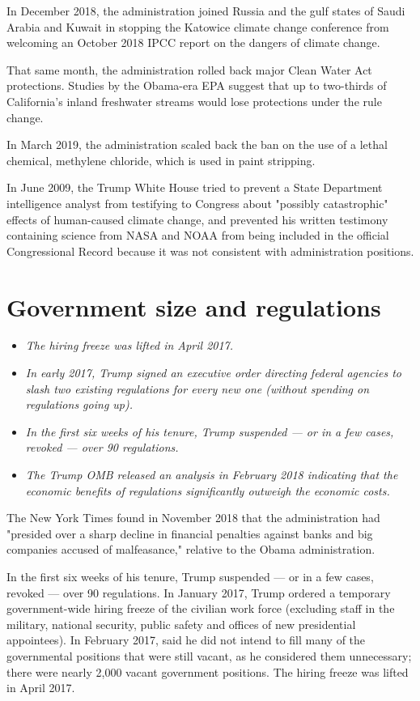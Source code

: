 In December 2018, the administration joined Russia and the gulf states
of Saudi Arabia and Kuwait in stopping the Katowice climate change
conference from welcoming an October 2018 IPCC report on the dangers of
climate change.

That same month, the administration rolled back major Clean Water Act
protections. Studies by the Obama-era EPA suggest that up to two-thirds
of California's inland freshwater streams would lose protections under
the rule change.

In March 2019, the administration scaled back the ban on the use of a
lethal chemical, methylene chloride, which is used in paint stripping.

In June 2009, the Trump White House tried to prevent a State Department
intelligence analyst from testifying to Congress about "possibly
catastrophic" effects of human-caused climate change, and prevented his
written testimony containing science from NASA and NOAA from being
included in the official Congressional Record because it was not
consistent with administration positions.

\section{Government size and
regulations}\label{government-size-and-regulations}

\begin{itemize}
\item
  \emph{The hiring freeze was lifted in April 2017.}
\item
  \emph{In early 2017, Trump signed an executive order directing federal
  agencies to slash two existing regulations for every new one (without
  spending on regulations going up).}
\item
  \emph{In the first six weeks of his tenure, Trump suspended --- or in
  a few cases, revoked --- over 90 regulations.}
\item
  \emph{The Trump OMB released an analysis in February 2018 indicating
  that the economic benefits of regulations significantly outweigh the
  economic costs.}
\end{itemize}

The New York Times found in November 2018 that the administration had
"presided over a sharp decline in financial penalties against banks and
big companies accused of malfeasance," relative to the Obama
administration.

In the first six weeks of his tenure, Trump suspended --- or in a few
cases, revoked --- over 90 regulations. In January 2017, Trump ordered a
temporary government-wide hiring freeze of the civilian work force
(excluding staff in the military, national security, public safety and
offices of new presidential appointees). In February 2017, said he did
not intend to fill many of the governmental positions that were still
vacant, as he considered them unnecessary; there were nearly 2,000
vacant government positions. The hiring freeze was lifted in April 2017.

